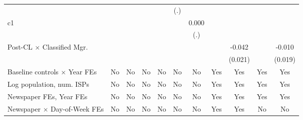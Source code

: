 {\begin{tabular}{l*{10}{c}}
                    &                     &                     &                     &                     &         (.)         &                     &                     &                     &                     &                     \\
\addlinespace
c1                  &                     &                     &                     &                     &                     &       0.000         &                     &                     &                     &                     \\
                    &                     &                     &                     &                     &                     &         (.)         &                     &                     &                     &                     \\
\addlinespace
Post-CL $\times$ Classified Mgr.&                     &                     &                     &                     &                     &                     &                     &      -0.042\sym{**} &                     &      -0.010         \\
                    &                     &                     &                     &                     &                     &                     &                     &     (0.021)         &                     &     (0.019)         \\
\addlinespace
Baseline controls $\times$ Year FEs &          No         &          No         &          No         &          No         &          No         &          No         &         Yes         &         Yes         &         Yes         &         Yes         \\
\addlinespace
Log population, num. ISPs &          No         &          No         &          No         &          No         &          No         &          No         &         Yes         &         Yes         &         Yes         &         Yes         \\
\addlinespace
Newspaper FEs, Year FEs &          No         &          No         &          No         &          No         &          No         &          No         &         Yes         &         Yes         &         Yes         &         Yes         \\
\addlinespace
Newspaper $\times$ Day-of-Week FEs &          No         &          No         &          No         &          No         &          No         &          No         &         Yes         &         Yes         &          No         &          No         \\

\end{tabular}}
